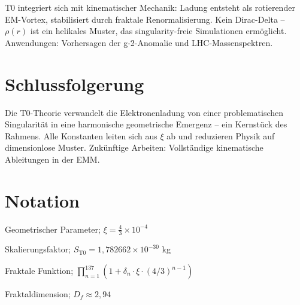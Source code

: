 	T0 integriert sich mit kinematischer Mechanik: Ladung entsteht als rotierender EM-Vortex, stabilisiert durch fraktale Renormalisierung. Kein Dirac-Delta – $\rho(r)$ ist ein helikales Muster, das singularity-freie Simulationen ermöglicht. Anwendungen: Vorhersagen der g-2-Anomalie und LHC-Massenspektren.
	
	\section{Schlussfolgerung}
	
	Die T0-Theorie verwandelt die Elektronenladung von einer problematischen Singularität in eine harmonische geometrische Emergenz – ein Kernstück des Rahmens. Alle Konstanten leiten sich aus $\xi$ ab und reduzieren Physik auf dimensionlose Muster. Zukünftige Arbeiten: Vollständige kinematische Ableitungen in der EMM.
	
	\appendix
	\section{Notation}
	\begin{description}[leftmargin=1cm]
		\item[$\xi$] Geometrischer Parameter; $\xi = \frac{4}{3} \times 10^{-4}$
		\item[$S_{\mathrm{T0}}$] Skalierungsfaktor; $S_{\mathrm{T0}} = 1{,}782662 \times 10^{-30}$ kg
		\item[$f_{\text{fractal}}$] Fraktale Funktion; $\prod_{n=1}^{137} (1 + \delta_n \cdot \xi \cdot (4/3)^{n-1})$
		\item[$D_f$] Fraktaldimension; $D_f \approx 2{,}94$
	\end{description}
